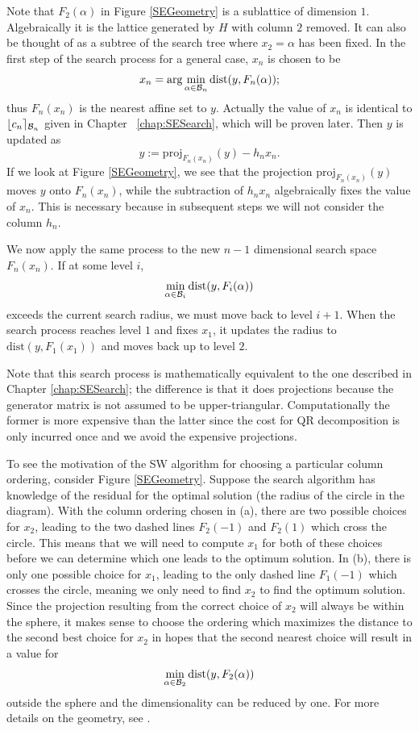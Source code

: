 \documentclass[12pt,Bold,letterpaper]{mcgilletdclass}
\newcommand{\dist}{\mathrm{dist}}
\begin{document}
Note that $F_2(\alpha)$ in Figure \ref{SEGeometry} is a sublattice of dimension $1$.  
Algebraically it is the lattice generated by $H$ with column
$2$ removed. It can also be thought of as a subtree of the search tree where
$x_2 = \alpha$ has been fixed. 
In the first step of the search process for a general case, $x_n$ is chosen to be
$$x_n=\arg\min_{\alpha\in {\cal B}_n}\dist(y,F_n(\alpha));$$ thus $F_n(x_n)$ is the nearest affine set to $y$. 
Actually the value of $x_n$ is identical to $\lfloor c_n \rceil_{{\cal B}_n}$ given in Chapter ~\ref{chap:SESearch},
which will be proven later.
Then  $y$ is updated  as $$y := \mbox{proj}_{F_n(x_n)}(y) - h_nx_n.$$ If we look
at Figure \ref{SEGeometry}, we see that the projection $\mbox{proj}_{F_n(x_n)}(y)$ moves $y$ onto $F_n(x_n)$, while the subtraction of $h_nx_n$ algebraically fixes the value of $x_n$. This is necessary because in subsequent steps we will not consider the column $h_n$.

We now apply the same process to the new $n-1$ dimensional search space
$F_n(x_n)$. If at some level $i$, $$\min_{\alpha\in {\cal B}_i}\dist(y,F_i(\alpha))$$ exceeds the current
search radius, we must move back to level $i+1$. %
When the search process reaches level $1$ and fixes $x_1$, it updates the radius to  
$\dist(y,F_1(x_1))$ and moves back up to level $2$.

Note that this search process is mathematically equivalent to the one described in Chapter
\ref{chap:SESearch}; the difference is that it  does projections
because  the generator matrix is not assumed to be upper-triangular. 
Computationally the former is more expensive than the latter since the cost for QR decomposition is only incurred once and we avoid the expensive projections.

To see the motivation of the SW algorithm for choosing a particular column ordering,
consider Figure \ref{SEGeometry}. Suppose the search algorithm has knowledge of
the residual for the optimal solution (the radius of the circle in the diagram).
With the column ordering chosen in (a), there are two possible choices for $x_2$,
leading to the two dashed lines $F_2(-1)$ and $F_2(1)$ which cross the circle. This means
that we will need to compute $x_1$ for both of these choices
before we can determine which one leads to the optimum solution. In (b), there
is only one possible choice for $x_1$,  leading to the only dashed line $F_1(-1)$
which crosses the circle, meaning we only need to find $x_2$ to find the optimum solution.
Since the projection resulting from the correct choice of $x_2$ will always be
within the sphere, it makes sense to choose the ordering which maximizes the
distance to the second best choice for $x_2$ in hopes that the second nearest
choice will result in a value for $$\min_{\alpha\in {\cal B}_2}\dist(y,F_2(\alpha))$$ outside the sphere and the
dimensionality can be reduced by one. 
For more details on the geometry, see  \cite{SuW05}.
\end{document}
